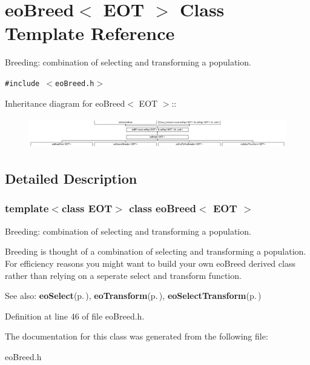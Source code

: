 \section{eo\-Breed$<$ EOT $>$ Class Template Reference}
\label{classeo_breed}
Breeding: combination of selecting and transforming a population.  


{\tt \#include $<$eo\-Breed.h$>$}

Inheritance diagram for eo\-Breed$<$ EOT $>$::\begin{figure}[H]
\begin{center}
\leavevmode
\includegraphics[height=1.37592cm]{classeo_breed}
\end{center}
\end{figure}


\subsection{Detailed Description}
\subsubsection*{template$<$class EOT$>$ class eo\-Breed$<$ EOT $>$}

Breeding: combination of selecting and transforming a population. 

Breeding is thought of a combination of selecting and transforming a population. For efficiency reasons you might want to build your own eo\-Breed derived class rather than relying on a seperate select and transform function.

\begin{Desc}
\item[See also:]{\bf eo\-Select}{\rm (p.\,\pageref{classeo_select})}, {\bf eo\-Transform}{\rm (p.\,\pageref{classeo_transform})}, {\bf eo\-Select\-Transform}{\rm (p.\,\pageref{classeo_select_transform})} \end{Desc}




Definition at line 46 of file eo\-Breed.h.

The documentation for this class was generated from the following file:\begin{CompactItemize}
\item 
eo\-Breed.h\end{CompactItemize}
